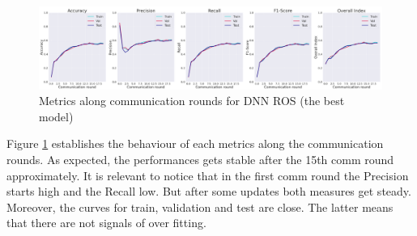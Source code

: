 \begin{figure}[H]
\centering
\includegraphics[scale=0.4]{img/comm_round_metrics_DNNROS.png}
\caption{Metrics along communication rounds for DNN ROS (the best model)}
\label{fig:comm_round_metrics_DNNROS}
\end{figure}

Figure \ref{fig:comm_round_metrics_DNNROS} establishes the behaviour of each metrics along the communication rounds. As expected, the performances gets stable after the 15th comm round approximately. It is relevant to notice that in the first comm round the Precision starts high and the Recall low. But after some updates both measures get steady. Moreover, the curves for train, validation and test are close. The latter means that there are not signals of over fitting.


